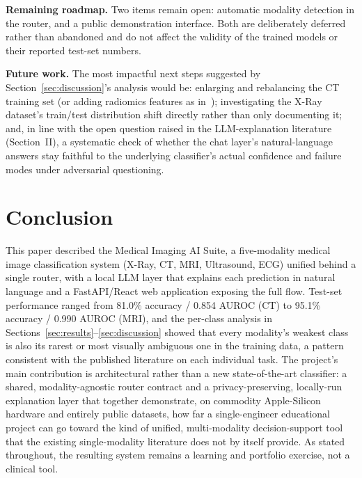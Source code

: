 \documentclass[conference]{IEEEtran}
\begin{document}
\textbf{Remaining roadmap.} Two items remain open: automatic modality detection in the router, and a public demonstration interface. Both are deliberately deferred rather than abandoned and do not affect the validity of the trained models or their reported test-set numbers.

\textbf{Future work.} The most impactful next steps suggested by Section~\ref{sec:discussion}'s analysis would be: enlarging and rebalancing the CT training set (or adding radiomics features as in~\cite{nodulex}); investigating the X-Ray dataset's train/test distribution shift directly rather than only documenting it; and, in line with the open question raised in the LLM-explanation literature (Section~II), a systematic check of whether the chat layer's natural-language answers stay faithful to the underlying classifier's actual confidence and failure modes under adversarial questioning.

\section{Conclusion}

This paper described the Medical Imaging AI Suite, a five-modality medical image classification system (X-Ray, CT, MRI, Ultrasound, ECG) unified behind a single router, with a local LLM layer that explains each prediction in natural language and a FastAPI/React web application exposing the full flow. Test-set performance ranged from 81.0\% accuracy / 0.854 AUROC (CT) to 95.1\% accuracy / 0.990 AUROC (MRI), and the per-class analysis in Sections~\ref{sec:results}--\ref{sec:discussion} showed that every modality's weakest class is also its rarest or most visually ambiguous one in the training data, a pattern consistent with the published literature on each individual task. The project's main contribution is architectural rather than a new state-of-the-art classifier: a shared, modality-agnostic router contract and a privacy-preserving, locally-run explanation layer that together demonstrate, on commodity Apple-Silicon hardware and entirely public datasets, how far a single-engineer educational project can go toward the kind of unified, multi-modality decision-support tool that the existing single-modality literature does not by itself provide. As stated throughout, the resulting system remains a learning and portfolio exercise, not a clinical tool.
\end{document}
